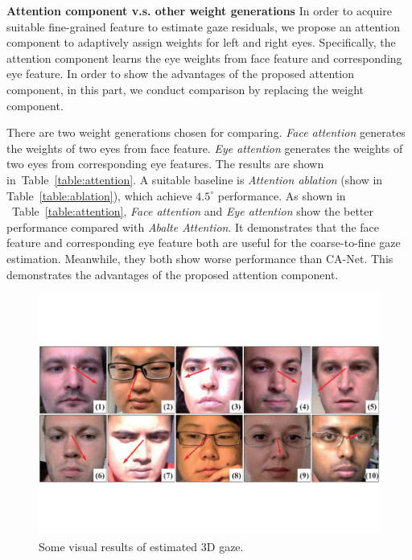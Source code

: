 \documentclass[letterpaper]{article}
\newcommand{\Tref}[1]{Table~\ref{#1}}
\begin{document}
\textbf{Attention component v.s. other weight generations}
In order to acquire suitable fine-grained feature to estimate gaze residuals,
we propose an attention component to adaptively assign weights for left and right eyes.
Specifically, the attention component learns the eye weights from face feature and corresponding eye feature.
In order to show the advantages of the proposed attention component, in this part, we conduct comparison by replacing the weight component.

There are two weight generations chosen for comparing.
\emph{Face attention} generates the weights of two eyes from face feature.
\emph{Eye attention} generates the weights of two eyes from corresponding eye features.
The results are shown in~\Tref{table:attention}.
A suitable baseline is \emph{Attention ablation} (show in \Tref{table:ablation}), which achieve $4.5^{\circ}$ performance.
As shown in ~\Tref{table:attention}, \emph{Face attention} and \emph{Eye attention} show the better performance compared with \emph{Abalte Attention}.
It demonstrates that the face feature and corresponding eye feature both are useful for the coarse-to-fine gaze estimation.
Meanwhile, they both show worse performance than CA-Net.
This demonstrates the advantages of the proposed attention component.

\begin{figure}[t]
	\begin{center}
		\includegraphics[width=0.99\columnwidth]{Figure-case.pdf}
	\end{center}
	\caption{Some visual results of estimated 3D gaze.}
	\label{fig:casestudy}
\end{figure}
\end{document}
